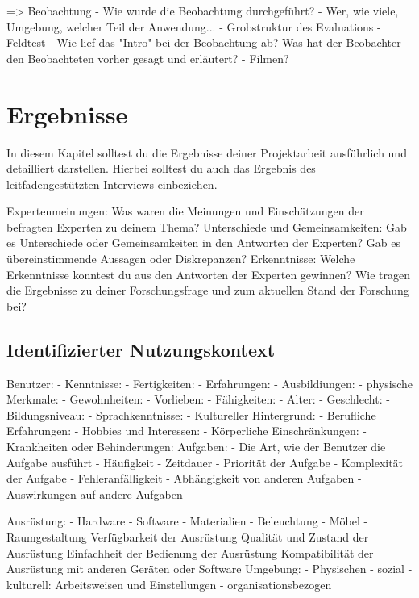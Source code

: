 => Beobachtung
		- Wie wurde die Beobachtung durchgeführt?
			- Wer, wie viele, Umgebung, welcher Teil der Anwendung...
			- Grobstruktur des Evaluations
			- Feldtest 
			- Wie lief das "Intro" bei der Beobachtung ab? Was hat der Beobachter den Beobachteten vorher gesagt und erläutert?
		- Filmen?

\section{Ergebnisse}
In diesem Kapitel solltest du die Ergebnisse deiner Projektarbeit ausführlich und detailliert darstellen. Hierbei solltest du auch das Ergebnis des leitfadengestützten Interviews einbeziehen.

Expertenmeinungen: Was waren die Meinungen und Einschätzungen der befragten Experten zu deinem Thema?
Unterschiede und Gemeinsamkeiten: Gab es Unterschiede oder Gemeinsamkeiten in den Antworten der Experten? Gab es übereinstimmende Aussagen oder Diskrepanzen?
Erkenntnisse: Welche Erkenntnisse konntest du aus den Antworten der Experten gewinnen? Wie tragen die Ergebnisse zu deiner Forschungsfrage und zum aktuellen Stand der Forschung bei?

\subsection{Identifizierter Nutzungskontext}

Benutzer:
    - Kenntnisse: 
    - Fertigkeiten:     
    - Erfahrungen:    
    - Ausbildiungen:     
    - physische Merkmale:     
    - Gewohnheiten:   
    - Vorlieben:    
    - Fähigkeiten: 
    - Alter: 
    - Geschlecht: 
    - Bildungsniveau: 
    - Sprachkenntnisse: 
    - Kultureller Hintergrund: 
    - Berufliche Erfahrungen: 
    - Hobbies und Interessen: 
    - Körperliche Einschränkungen: 
    - Krankheiten oder Behinderungen: 
Aufgaben:
    - Die Art, wie der Benutzer die Aufgabe ausführt
    - Häufigkeit
    - Zeitdauer
    - Priorität der Aufgabe
    - Komplexität der Aufgabe
    - Fehleranfälligkeit
    - Abhängigkeit von anderen Aufgaben
    - Auswirkungen auf andere Aufgaben

Ausrüstung:
    - Hardware
    - Software
    - Materialien
    - Beleuchtung
    - Möbel
    - Raumgestaltung
Verfügbarkeit der Ausrüstung
Qualität und Zustand der Ausrüstung
Einfachheit der Bedienung der Ausrüstung
Kompatibilität der Ausrüstung mit anderen Geräten oder Software
Umgebung: 
    - Physischen
    - sozial 
    - kulturell: Arbeitsweisen und Einstellungen
    - organisationsbezogen 
    

